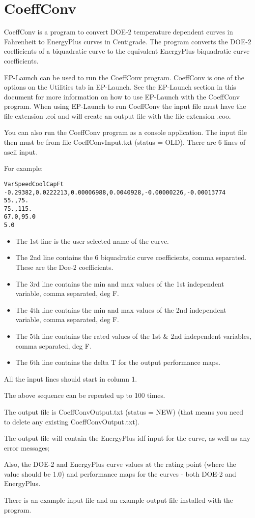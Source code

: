 \section{CoeffConv}\label{coeffconv}

CoeffConv is a program to convert DOE-2 temperature dependent curves in Fahrenheit to EnergyPlus curves in Centigrade. The program converts the DOE-2 coefficients of a biquadratic curve to the equivalent EnergyPlus biquadratic curve coefficients.

EP-Launch can be used to run the CoeffConv program. CoeffConv is one of the options on the Utilities tab in EP-Launch. See the EP-Launch section in this document for more information on how to use EP-Launch with the CoeffConv program. When using EP-Launch to run CoeffConv the input file must have the file extension .coi and will create an output file with the file extension .coo.

You can also run the CoeffConv program as a console application. The input file then must be from file CoeffConvInput.txt (status = OLD). There are 6 lines of ascii input.

For example:

\begin{lstlisting}
VarSpeedCoolCapFt
-0.29382,0.0222213,0.00006988,0.0040928,-0.00000226,-0.00013774
55.,75.
75.,115.
67.0,95.0
5.0
\end{lstlisting}

\begin{itemize}
\tightlist
\item
  The 1st line is the user selected name of the curve.
\item
  The 2nd line contains the 6 biquadratic curve coefficients, comma separated. These are the Doe-2 coefficients.
\item
  The 3rd line contains the min and max values of the 1st independent variable, comma separated, deg F.
\item
  The 4th line contains the min and max values of the 2nd independent variable, comma separated, deg F.
\item
  The 5th line contains the rated values of the 1st \& 2nd independent variables, comma separated, deg F.
\item
  The 6th line contains the delta T for the output performance maps.
\end{itemize}

All the input lines should start in column 1.

The above sequence can be repeated up to 100 times.

The output file is CoeffConvOutput.txt (status = NEW) (that means you need to delete any existing CoeffConvOutput.txt).

The output file will contain the EnergyPlus idf input for the curve, as well as any error messages;

Also, the DOE-2 and EnergyPlus curve values at the rating point (where the value should be 1.0) and performance maps for the curves - both DOE-2 and EnergyPlus.

There is an example input file and an example output file installed with the program.
